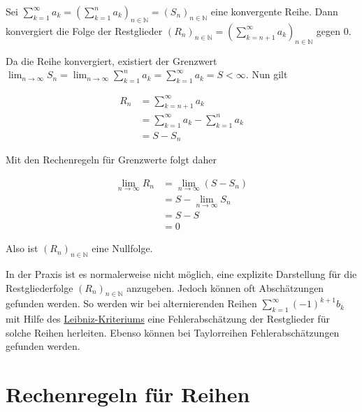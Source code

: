 \documentclass[fontsize=9pt,
               parskip=half-,
               DIV=14,
               listof=chapterentry,
               tocflat]{scrbook}
\begin{document}
\begin{theorem*}
Sei $\sum _{k=1}^{\infty }a_{k}=\left(\sum _{k=1}^{n}a_{k}\right)_{n\in \mathbb {N} }=(S_{n})_{n\in \mathbb {N} }$ eine konvergente Reihe. Dann konvergiert die Folge der Restglieder $(R_{n})_{n\in \mathbb {N} }=\left(\sum _{k=n+1}^{\infty }a_{k}\right)_{n\in \mathbb {N} }$ gegen $0$.

\end{theorem*}

\begin{proof*}
Da die Reihe konvergiert, existiert der Grenzwert $\lim _{n\to \infty }S_{n}=\lim _{n\to \infty }\sum _{k=1}^{n}a_{k}=\sum _{k=1}^{\infty }a_{k}=S<\infty $. Nun gilt

\begin{align*}
R_{n}&=\sum _{k=n+1}^{\infty }a_{k}\\&=\sum _{k=1}^{\infty }a_{k}-\sum _{k=1}^{n}a_{k}\\&=S-S_{n}
\end{align*}

Mit den Rechenregeln für Grenzwerte folgt daher

\begin{align*}
\lim _{n\to \infty }R_{n}&=\lim _{n\to \infty }(S-S_{n})\\&=S-\lim _{n\to \infty }S_{n}\\&=S-S\\&=0
\end{align*}

Also ist $(R_{n})_{n\in \mathbb {N} }$ eine Nullfolge.

\end{proof*}

\begin{hint*}
In der Praxis ist es normalerweise nicht möglich, eine explizite Darstellung für die Restgliederfolge $(R_{n})_{n\in \mathbb {N} }$ anzugeben. Jedoch können oft Abschätzungen gefunden werden. So werden wir bei alternierenden Reihen $\sum _{k=1}^{\infty }(-1)^{k+1}b_{k}$ mit Hilfe des \href{https://de.wikibooks.org/wiki/Mathe\_für\_Nicht-Freaks:\_Leibniz-Kriterium}
{Leibniz-Kriteriums} eine Fehlerabschätzung der Restglieder für solche Reihen herleiten. Ebenso können bei Taylorreihen Fehlerabschätzungen gefunden werden.

\end{hint*}

\chapter{Rechenregeln für Reihen}
\end{document}
